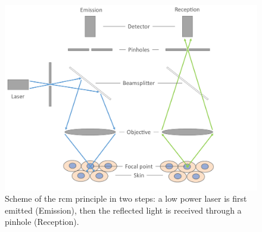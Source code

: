 \documentclass[journal,article,accept,moreauthors,pdftex, applsci]{Definitions/mdpi}
\providecommand{\DIFaddbeginFL}{} %
\providecommand{\DIFaddendFL}{} %
\providecommand{\DIFdelbeginFL}{} %
\providecommand{\DIFdelendFL}{} %
\begin{document}
\begin{figure}[H]
    \begin{center}
        \DIFdelbeginFL %
\DIFdelendFL \DIFaddbeginFL \includegraphics[width=0.6\linewidth]{Figures/RCM.pdf}
        \DIFaddendFL \caption{Scheme of the \ac{rcm} principle in two steps: a low power laser is first emitted (Emission), then the reflected light is received through a pinhole (Reception).}
        \label{fig:rcm}
    \end{center} 
\end{figure}\par
\end{document}
